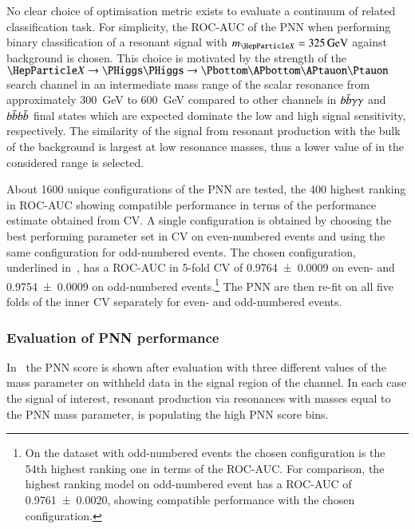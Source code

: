 No clear choice of optimisation metric exists to evaluate a continuum
of related classification task. For simplicity, the ROC-AUC of the PNN
when performing binary classification of a resonant signal with
$\mX = \SI{325}{\GeV}$ against background is chosen. This choice is
motivated by the strength of the $\PX \to \HH \to \bbtautau$ search
channel in an intermediate mass range of the scalar resonance from
approximately \SI{300}{\GeV} to \SI{600}{\GeV} compared to other
channels in $b\bar{b}\gamma\gamma$ and $b\bar{b}b\bar{b}$ final states which
are expected dominate the low and high \mX signal sensitivity,
respectively. The similarity of the \HH signal from resonant
production with the bulk of the background is largest at low resonance
masses, thus a lower value of \mX in the considered range is selected.

About 1600 unique configurations of the PNN are tested, the 400
highest ranking in ROC-AUC showing compatible performance in terms of
the performance estimate obtained from CV. A single configuration is
obtained by choosing the best performing parameter set in CV on
even-numbered events and using the same configuration for odd-numbered
events. The chosen configuration, underlined
in~, has a ROC-AUC in 5-fold CV of
\num{0.9764 +- 0.0009} on even- and \num{0.9754 +- 0.0009} on
odd-numbered events.\footnote{On the dataset with odd-numbered events
  the chosen configuration is the 54th highest ranking one in terms of
  the ROC-AUC. For comparison, the highest ranking model on
  odd-numbered event has a ROC-AUC of \num{0.9761 +- 0.0020}, showing
  compatible performance with the chosen configuration.} The PNN are
then re-fit on all five folds of the inner CV separately for even- and
odd-numbered events.

\subsubsection{Evaluation of PNN performance}

In~ the PNN score is shown after evaluation
with three different values of the mass parameter on withheld data in
the signal region of the \hadhad channel. In each case the signal of
interest, resonant production via resonances with masses equal to the
PNN mass parameter, is populating the high PNN score bins.

